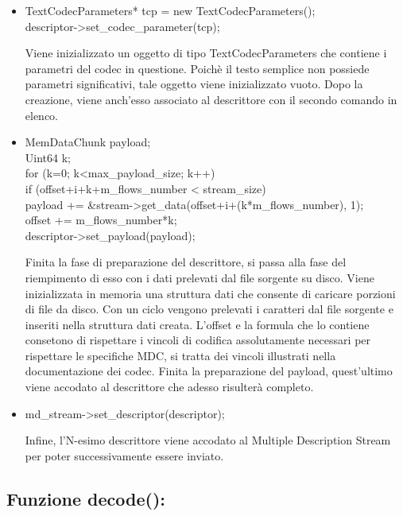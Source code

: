 \begin{itemize}
 \item \begin{code}
TextCodecParameters* tcp = new TextCodecParameters();\\
descriptor->set\_codec\_parameter(tcp);\\
\end{code}
Viene inizializzato un oggetto di tipo TextCodecParameters che contiene i parametri del codec in questione. Poich\`e il testo semplice non possiede parametri significativi, tale oggetto viene inizializzato vuoto. Dopo la creazione, viene anch'esso associato al descrittore con il secondo comando in elenco.
 \item \begin{code}
MemDataChunk payload;\\
Uint64 k;\\
for (k=0; k<max\_payload\_size; k++)\\
if (offset+i+k+m\_flows\_number < stream\_size)\\
payload += \&stream->get\_data(offset+i+(k*m\_flows\_number), 1);\\
offset += m\_flows\_number*k;\\
descriptor->set\_payload(payload);\\
\end{code}
Finita la fase di preparazione del descrittore, si passa alla fase del riempimento di esso con i dati prelevati dal file sorgente su disco. Viene inizializzata in memoria una struttura dati che consente di caricare porzioni di file da disco. Con un ciclo vengono prelevati i caratteri dal file sorgente e inseriti nella struttura dati creata. L'offset e la formula che lo contiene consetono di rispettare i vincoli di codifica assolutamente necessari per rispettare le specifiche MDC, si tratta dei vincoli illustrati nella documentazione dei codec. Finita la preparazione del payload, quest'ultimo viene accodato al descrittore che adesso risulter\`a completo.
 \item \begin{code}
md\_stream->set\_descriptor(descriptor);\\
\end{code}
Infine, l'N-esimo descrittore viene accodato al Multiple Description Stream per poter successivamente essere inviato.
\end{itemize}

\subsection{Funzione decode():}

